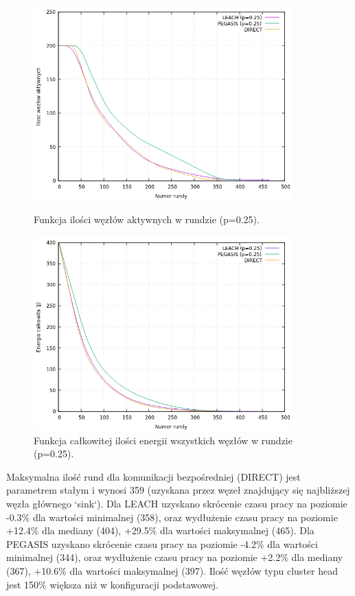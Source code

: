 \documentclass[a4paper,12pt,twoside,openany]{report}
\begin{document}
\begin{figure}[H]
 \centering
 \includegraphics[width=10cm]{images/gnuplot/test_4/nodes_in_round_p025.png}
 \caption{Funkcja ilości węzłów aktywnych w rundzie (p=0.25).}
 \includegraphics[width=10cm]{images/gnuplot/test_4/energy_in_round_p025.png}
 \caption{Funkcja całkowitej ilości energii wszystkich węzłów w rundzie (p=0.25).}
\end{figure}

\par
Maksymalna ilość rund dla komunikacji bezpośredniej (DIRECT) jest parametrem stałym i wynosi 359 (uzyskana przez węzeł znajdujący się najbliższej węzła głównego `sink`).
Dla LEACH uzyskano skrócenie czasu pracy na poziomie -0.3\% dla wartości minimalnej (358), oraz wydłużenie czasu pracy na poziomie +12.4\% dla mediany (404), +29.5\% dla wartości maksymalnej (465).
Dla PEGASIS uzyskano skrócenie czasu pracy na poziomie -4.2\% dla wartości minimalnej (344), oraz wydłużenie czasu pracy na poziomie +2.2\% dla mediany (367), +10.6\% dla wartości maksymalnej (397).
Ilość węzłów typu cluster head jest 150\% większa niż w konfiguracji podstawowej.
\end{document}
